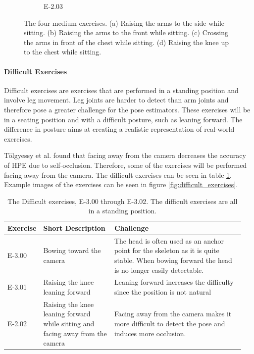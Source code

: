 \begin{figure}
\begin{subfigure}[b]{0.16\linewidth}
        \caption[]{E-2.03}
    \end{subfigure}
    \caption[Easy Exercises]{The four medium exercises. (a) Raising the arms to the side while sitting. (b) Raising the arms to the front while sitting. (c) Crossing the arms in front of the chest while sitting. (d) Raising the knee up to the chest while sitting.}
    \label{fig:medium_exercises}
  \end{figure}  


\paragraph{Difficult Exercises}

Difficult exercises are exercises that are performed in a standing position and involve leg movement. Leg joints are harder to detect than arm joints and therefore pose a greater challenge for the pose estimators. These exercises will be in a seating position and with a difficult posture, such as leaning forward. The difference in posture aims at creating a realistic representation of real-world exercises.

Tölgyessy et al. found that facing away from the camera decreases the accuracy of HPE due to self-occlusion. \cite{HPEIsHard} Therefore, some of the exercises will be performed facing away from the camera. The difficult exercises can be seen in table \ref{tab:difficult_exercises}. Example images of the exercises can be seen in figure \ref{fig:difficult_exercises}.

\begin{table}[]
  \caption[Difficult Exercises]{The Difficult exercises, E-3.00 through E-3.02. The difficult exercises are all in a standing position.}
  \label{tab:difficult_exercises}
  \begin{tabular}{p{0.1\linewidth}p{0.3\linewidth}p{0.55\linewidth}}
  \hline
  Exercise & Short Description                                                              & Challenge \\ \hline
  E-3.00   & Bowing toward the camera                                                       & The head is often used as an anchor point for the skeleton as it is quite stable. When bowing forward the head is no longer easily detectable. \\
  E-3.01   & Raising the knee leaning forward                                               & Leaning forward increases the difficulty since the position is not natural \\
  E-2.02   & Raising the knee leaning forward while sitting and facing away from the camera & Facing away from the camera makes it more difficult to detect the pose and induces more occlusion.  \\ \hline
  \end{tabular}
\end{table}


